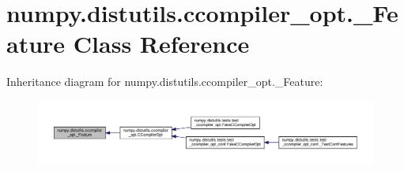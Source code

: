 \hypertarget{classnumpy_1_1distutils_1_1ccompiler__opt_1_1__Feature}{}\section{numpy.\+distutils.\+ccompiler\+\_\+opt.\+\_\+\+Feature Class Reference}
\label{classnumpy_1_1distutils_1_1ccompiler__opt_1_1__Feature}


Inheritance diagram for numpy.\+distutils.\+ccompiler\+\_\+opt.\+\_\+\+Feature\+:
\nopagebreak
\begin{figure}[H]
\begin{center}
\leavevmode
\includegraphics[width=350pt]{classnumpy_1_1distutils_1_1ccompiler__opt_1_1__Feature__inherit__graph}
\end{center}
\end{figure}
